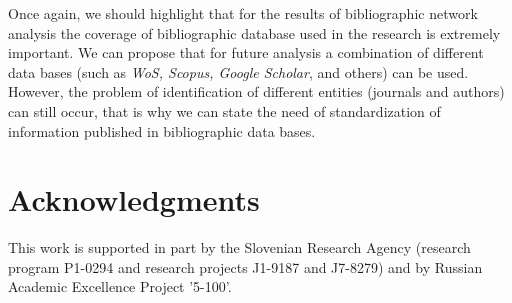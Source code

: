 \documentclass[11pt]{article} %
\begin{document}
Once again, we should highlight that for the results of bibliographic network analysis the coverage of bibliographic database used in the research is extremely important. We can propose that for future analysis a combination of different data bases (such as \textit{WoS, Scopus, Google Scholar}, and others) can be used. However, the problem of identification of different entities (journals and authors) can still occur, that is why we can state the need of standardization of information published in bibliographic data bases. \medskip 

\section*{Acknowledgments}
This work is supported in part by the Slovenian Research Agency (research program P1-0294 and research projects J1-9187 and J7-8279) and by Russian Academic Excellence Project '5-100'.
\end{document}

